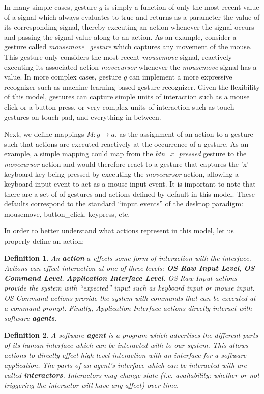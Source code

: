 \documentclass{article}
\newtheorem{define}{Definition}
\begin{document}
\noindent
In many simple cases, gesture $g$ is simply a function of only the most recent value of a signal which always evaluates to true and returns as a parameter the value of its corresponding signal, thereby executing an action whenever the signal occurs and passing the signal value along to an action. As an example, consider a gesture called \textit{mousemove\_gesture} which captures any movement of the mouse. This gesture only considers the most recent \textit{mousemove} signal, reactively executing its associated action \textit{movecursor} whenever the \textit{mousemove} signal has a value. In more complex cases, gesture $g$ can implement a more expressive recognizer such as machine learning-based gesture recognizer. Given the flexibility of this model, gestures can capture simple units of interaction such as a mouse click or a button press, or very complex units of interaction such as touch gestures on touch pad, and everything in between.

Next, we define mappings $M: g \rightarrow a$, as the assignment of an action to a gesture such that actions are executed reactively at the occurrence of a gesture. As an example, a simple mapping could map from the \textit{btn\_x\_pressed} gesture to the \textit{movecursor} action and would therefore react to a gesture that captures the 'x' keyboard key being pressed by executing the \textit{movecursor} action, allowing a keyboard input event to act as a mouse input event. It is important to note that there are a set of of gestures and actions defined by default in this model. These defaults correspond to the standard ``input events'' of the desktop paradigm: mousemove, button\_click, keypress, etc. 

In order to better understand what actions represent in this model, let us properly define an action:

\begin{define}
\label{def:action}
An \textbf{action} $a$ effects some form of interaction with the interface. Actions can effect interaction at one of three levels: \textbf{OS Raw Input Level}, \textbf{OS Command Level}, \textbf{Application Interface Level}. OS Raw Input actions provide the system with ``expected'' input such as keyboard input or mouse input. OS Command actions provide the system with commands that can be executed at a command prompt. Finally, Application Interface actions directly interact with software \textbf{agents}.
\end{define}

\begin{define}
\label{def:agent}
A software \textbf{agent} is a program which advertises the different parts of its human interface which can be interacted with to our system. This allows actions to directly effect high level interaction with an interface for a software application. The parts of an agent's interface which can be interacted with are called \textbf{interactors}. Interactors may change state (i.e. availability: whether or not triggering the interactor will have any affect) over time.
\end{define}
\end{document}
